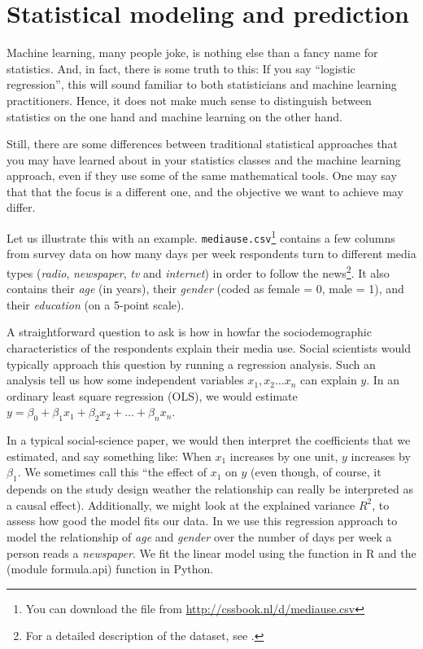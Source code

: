 \section{Statistical modeling and prediction}
\label{sec:prediction}
Machine learning, many people joke, is nothing else than a fancy name
for statistics.  And, in fact, there is some truth to this: If you say
``logistic regression'', this will sound familiar to both
statisticians and machine learning practitioners.  Hence, it does not
make much sense to distinguish between statistics on the one hand and
machine learning on the other hand.

Still, there are some differences between traditional statistical
approaches that you may have learned about in your statistics classes
and the machine learning approach, even if they use some of the same
mathematical tools. One may say that that the focus is a different
one, and the objective we want to achieve may differ.

Let us illustrate this with an example.
\texttt{mediause.csv}\footnote{You can download the file from
  \url{http://cssbook.nl/d/mediause.csv}} contains a few columns from
survey data on how many days per week respondents turn to different
media types (\emph{radio}, \emph{newspaper}, \emph{tv} and \emph{internet}) in order to follow the news\footnote{For a detailed
  description of the dataset, see \citet{Trilling2013phd}.}. It also
contains their \emph{age} (in years), their \emph{gender} (coded as female = 0, male = 1), and their \emph{education} (on a 5-point scale).

A straightforward question to ask is how in howfar the
sociodemographic characteristics of the respondents explain their
media use.  Social scientists would typically approach this question
by running a regression analysis.  Such an analysis tell us how some
independent variables $x_1, x_2 \ldots x_n$ can explain $y$.  In an
ordinary least square regression (OLS), we would estimate $y=\beta_0 +
\beta_1 x_1 + \beta_2 x_2 + \ldots + \beta_n x_n$.

In a typical social-science paper, we would then interpret the coefficients
that we estimated, and say something like: When $x_1$ increases by one unit,
$y$ increases by $\beta_1$.
We sometimes call this ``the effect of $x_1$ on $y$ (even though, of course,
it depends on the study design weather the relationship can really be interpreted
as a causal effect).
Additionally, we might look at the explained variance $R^2$, to assess how good the model fits our data. In  we use this regression approach to model the relationship of \emph{age} and \emph{gender} over the number of days per week a person reads a \emph{newspaper}. We fit the linear model using the  function  in R and the  (module formula.api) function  in Python.

